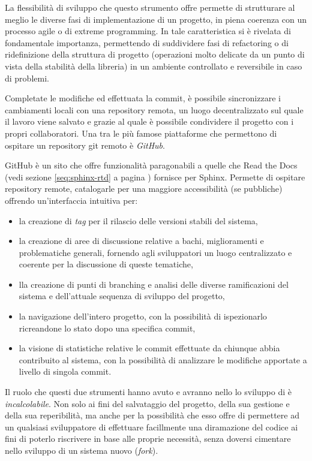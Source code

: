 La flessibilità di sviluppo che questo strumento offre permette di strutturare
al meglio le diverse fasi di implementazione di un progetto, in piena coerenza con
un processo agile o di extreme programming. In \pygfa tale caratteristica
si è rivelata di fondamentale importanza, permettendo di suddividere
fasi di refactoring o di ridefinizione della struttura di progetto (operazioni
molto delicate da un punto di vista della stabilità della libreria) in un
ambiente controllato e reversibile in caso di problemi.

Completate le modifiche ed effettuata la commit, è possibile sincronizzare
i cambiamenti locali con una repository remota, un luogo decentralizzato
sul quale il lavoro viene salvato e grazie al quale è possibile condividere
il progetto con i propri collaboratori. Una tra le più famose piattaforme
che permettono di ospitare un repository git remoto è \emph{GitHub}.

GitHub è un sito che offre funzionalità paragonabili a quelle che Read
the Docs (vedi sezione \ref{seq:sphinx-rtd} a pagina \pageref{seq:sphinx})
fornisce per Sphinx. Permette di ospitare repository remote, catalogarle
per una maggiore accessibilità (se pubbliche) offrendo un'interfaccia
intuitiva per:
\begin{itemize}
	\item la creazione di \emph{tag} per il rilascio delle versioni stabili del sistema,
	\item la creazione di aree di discussione relative a bachi, miglioramenti e problematiche
		generali, fornendo agli sviluppatori un luogo centralizzato e coerente
		per la discussione di queste tematiche,
	\item lla creazione di punti di branching e analisi delle diverse ramificazioni del sistema
		e dell'attuale sequenza di sviluppo del progetto,
	\item la navigazione dell'intero progetto, con la possibilità di ispezionarlo
		ricreandone lo stato dopo una specifica commit,
	\item la visione di statistiche relative le commit effettuate da chiunque
		abbia contribuito al sistema, con la possibilità di analizzare le modifiche
		apportate a livello di singola commit.
\end{itemize}

Il ruolo che questi due strumenti hanno avuto e avranno nello lo sviluppo
di \pygfa è \emph{incalcolabile}. Non solo ai fini del salvataggio del
progetto, della sua gestione e della sua reperibilità, ma anche per la
possibilità che esso offre di permettere ad un qualsiasi sviluppatore di
effettuare facillmente una diramazione del codice ai fini di poterlo
riscrivere in base alle proprie necessità, senza doversi cimentare
nello sviluppo di un sistema nuovo (\emph{fork}).

